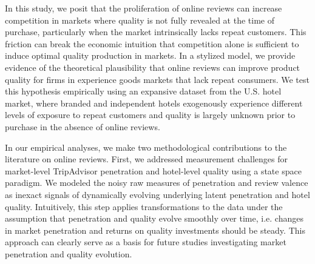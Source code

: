 \documentclass[mksc,blindrev]{informs3} %
\begin{document}
In this study, we posit that the proliferation of online reviews can increase competition in markets where quality is not fully revealed at the time of purchase, particularly when the market intrinsically lacks repeat customers. This friction can break the economic intuition that competition alone is sufficient to induce optimal quality production in markets. In a stylized model, we provide evidence of the theoretical plausibility that online reviews can improve product quality for firms in experience goods markets that lack repeat consumers. We test this hypothesis empirically using an expansive dataset from the U.S. hotel market, where branded and independent hotels exogenously experience different levels of exposure to repeat customers and quality is largely unknown prior to purchase in the absence of online reviews. 

In our empirical analyses, we make two methodological contributions to the literature on online reviews. First, we addressed measurement challenges for market-level TripAdvisor penetration and hotel-level quality using a state space paradigm. We modeled the noisy raw measures of penetration and review valence as inexact signals of dynamically evolving underlying latent penetration and hotel quality. Intuitively, this step applies transformations to the data under the assumption that penetration and quality evolve smoothly over time, i.e. changes in market penetration and returns on quality investments should be steady. This approach can clearly serve as a basis for future studies investigating market penetration and quality evolution.
\end{document}
